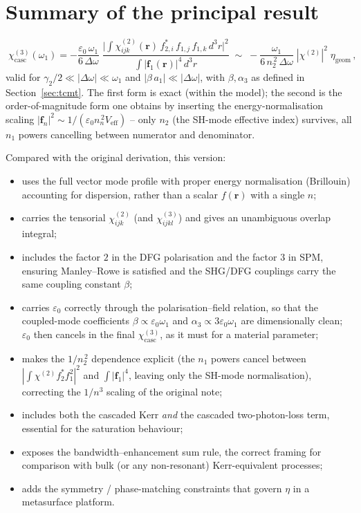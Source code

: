 \documentclass[11pt,a4paper]{article}
\newcommand{\eps}{\varepsilon}
\newcommand{\bvec}[1]{\mathbf{#1}}
\newcommand{\f}{\bvec{f}}
\newcommand{\ri}{\bvec{r}}
\newcommand{\dthreer}{\,d^{3}r}
\newcommand{\chitwo}{\chi^{(2)}}
\newcommand{\chithree}{\chi^{(3)}}
\newcommand{\Dom}{\Delta\omega}
\begin{document}
\section{Summary of the principal result}

\begin{equation}
  \boxed{\;\chithree_\text{casc}(\omega_1)
        =-\frac{\eps_0\,\omega_1}{6\,\Dom}\;
          \frac{\bigl|\!\int\!\chitwo_{ijk}(\ri)\,f_{2,i}^*\,f_{1,j}\,f_{1,k}\dthreer\bigr|^{2}}
               {\int|\f_1(\ri)|^{4}\dthreer}
        \;\sim\;-\frac{\omega_1}{6\,n_2^{\,2}\,\Dom}\;|\chitwo|^{2}\;\eta_\text{geom}\,,\;}
\end{equation}
valid for $\gamma_2/2\ll|\Dom|\ll\omega_1$ and $|\beta\,a_1|\ll|\Dom|$,
with $\beta,\alpha_3$ as defined in Section~\ref{sec:tcmt}.  The first
form is exact (within the model); the second is the order-of-magnitude
form one obtains by inserting the energy-normalisation scaling
$|\f_n|^2\sim 1/(\eps_0 n_n^{\,2}V_\text{eff})$ -- only $n_2$ (the SH-mode
effective index) survives, all $n_1$ powers cancelling between
numerator and denominator.

Compared with the original derivation, this version:
\begin{itemize}
  \item uses the full vector mode profile with proper energy
        normalisation (Brillouin) accounting for dispersion, rather
        than a scalar $f(\ri)$ with a single $n$;
  \item carries the tensorial $\chitwo_{ijk}$ (and $\chithree_{ijkl}$)
        and gives an unambiguous overlap integral;
  \item includes the factor $2$ in the DFG polarisation and the factor
        $3$ in SPM, ensuring Manley--Rowe is satisfied and the SHG/DFG
        couplings carry the same coupling constant $\beta$;
  \item carries $\eps_0$ correctly through the polarisation--field
        relation, so that the coupled-mode coefficients
        $\beta\propto\eps_0\omega_1$ and $\alpha_3\propto 3\eps_0\omega_1$
        are dimensionally clean; $\eps_0$ then cancels in the final
        $\chithree_\text{casc}$, as it must for a material parameter;
  \item makes the $1/n_2^{\,2}$ dependence explicit (the $n_1$ powers
        cancel between $|\!\int\!\chitwo f_2^*f_1^2|^2$ and $\int|\f_1|^4$,
        leaving only the SH-mode normalisation), correcting the
        $1/n^3$ scaling of the original note;
  \item includes both the cascaded Kerr \emph{and} the cascaded
        two-photon-loss term, essential for the saturation behaviour;
  \item exposes the bandwidth--enhancement sum rule, the correct
        framing for comparison with bulk (or any non-resonant)
        Kerr-equivalent processes;
  \item adds the symmetry / phase-matching constraints that govern
        $\eta$ in a metasurface platform.
\end{itemize}
\end{document}

